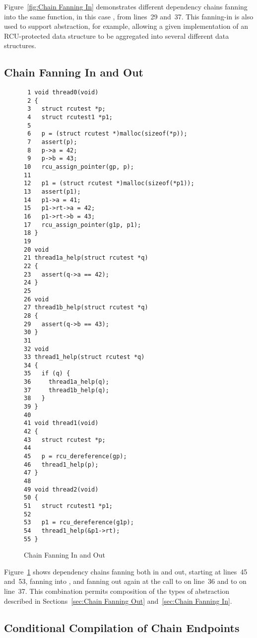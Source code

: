 \documentclass[letterpaper,twocolumn,10pt]{article}
\begin{document}
Figure~\ref{fig:Chain Fanning In}
demonstrates different dependency chains fanning into the same function,
in this case , from lines~29 and~37.
This fanning-in is also used to support abstraction, for example,
allowing a given implementation of an RCU-protected data structure
to be aggregated into several different data structures.

\subsection{Chain Fanning In and Out}
\label{sec:Chain Fanning In and Out}

\begin{figure}[tbp]
{ \scriptsize
\begin{verbatim}
 1 void thread0(void)
 2 {
 3   struct rcutest *p;
 4   struct rcutest1 *p1;
 5
 6   p = (struct rcutest *)malloc(sizeof(*p));
 7   assert(p);
 8   p->a = 42;
 9   p->b = 43;
10   rcu_assign_pointer(gp, p);
11
12   p1 = (struct rcutest *)malloc(sizeof(*p1));
13   assert(p1);
14   p1->a = 41;
15   p1->rt->a = 42;
16   p1->rt->b = 43;
17   rcu_assign_pointer(g1p, p1);
18 }
19
20 void
21 thread1a_help(struct rcutest *q)
22 {
23   assert(q->a == 42);
24 }
25
26 void
27 thread1b_help(struct rcutest *q)
28 {
29   assert(q->b == 43);
30 }
31
32 void
33 thread1_help(struct rcutest *q)
34 {
35   if (q) {
36     thread1a_help(q);
37     thread1b_help(q);
38   }
39 }
40
41 void thread1(void)
42 {
43   struct rcutest *p;
44
45   p = rcu_dereference(gp);
46   thread1_help(p);
47 }
48
49 void thread2(void)
50 {
51   struct rcutest1 *p1;
52
53   p1 = rcu_dereference(g1p);
54   thread1_help(&p1->rt);
55 }
\end{verbatim}
}
\caption{Chain Fanning In and Out}
\label{fig:Chain Fanning In and Out}
\end{figure}

Figure~\ref{fig:Chain Fanning In and Out}
shows dependency chains fanning both in and out, starting
at lines~45 and~53, fanning into , and
fanning out again at the call to  on
line~36 and to  on line~37.
This combination permits composition of the types of abstraction
described in
Sections~\ref{sec:Chain Fanning Out}
and~\ref{sec:Chain Fanning In}.

\subsection{Conditional Compilation of Chain Endpoints}
\label{sec:Conditional Compilation of Chain Endpoints}
\end{document}
